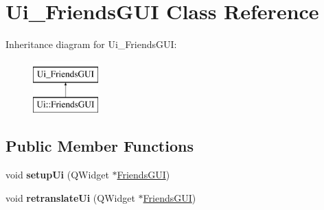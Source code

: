 \hypertarget{classUi__FriendsGUI}{}\section{Ui\+\_\+\+Friends\+G\+UI Class Reference}
\label{classUi__FriendsGUI}
Inheritance diagram for Ui\+\_\+\+Friends\+G\+UI\+:\begin{figure}[H]
\begin{center}
\leavevmode
\includegraphics[height=2.000000cm]{classUi__FriendsGUI}
\end{center}
\end{figure}
\subsection*{Public Member Functions}
\begin{DoxyCompactItemize}
\item 
void {\bfseries setup\+Ui} (Q\+Widget $\ast$\hyperlink{classFriendsGUI}{Friends\+G\+UI})\hypertarget{classUi__FriendsGUI_ac051416e7bbf937fff0eb1cbf32015f8}{}\label{classUi__FriendsGUI_ac051416e7bbf937fff0eb1cbf32015f8}

\item 
void {\bfseries retranslate\+Ui} (Q\+Widget $\ast$\hyperlink{classFriendsGUI}{Friends\+G\+UI})\hypertarget{classUi__FriendsGUI_a15a1233666b99ea17077d1bf3d222d16}{}\label{classUi__FriendsGUI_a15a1233666b99ea17077d1bf3d222d16}

\end{DoxyCompactItemize}
